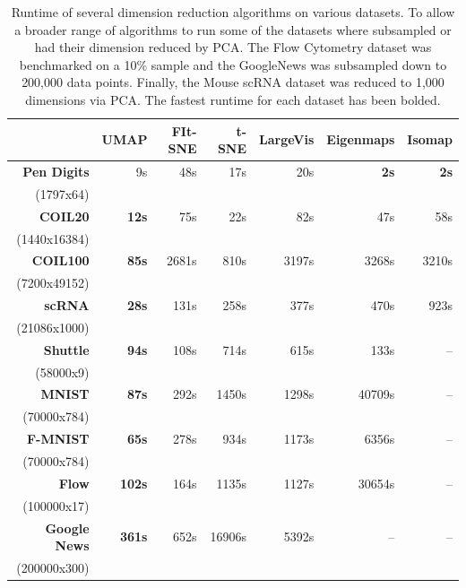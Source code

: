 \documentclass[12pt]{article}
\begin{document}
\begin{table}[!hptb]
    \centering
    \begin{tabular}{rrrrrrr}
    \toprule
      & {\bf UMAP} & {\bf FIt-SNE} & {\bf t-SNE} & {\bf LargeVis} & {\bf Eigenmaps} & {\bf Isomap} \\
    \hline
    {\bf Pen Digits}& 9s & 48s & 17s & 20s & \textbf{2s} & \textbf{2s}\\
    {\small (1797x64)}& & & & & & \\[10pt]
    {\bf COIL20} & \textbf{12s} & 75s & 22s & 82s & 47s & 58s \\
    {\small (1440x16384)}& & & & & & \\[10pt]
    {\bf COIL100} & \textbf{85s} & 2681s & 810s & 3197s & 3268s & 3210s \\
    {\small (7200x49152)}& & & & & & \\[10pt]
    {\bf scRNA} & \textbf{28s} & 131s & 258s & 377s & 470s & 923s \\
    {\small (21086x1000)}& & & & & & \\[10pt]
    {\bf Shuttle} & \textbf{94s} & 108s & 714s & 615s & 133s &  -- \\
    {\small (58000x9)}& & & & & & \\[10pt]
    {\bf MNIST} & \textbf{87s} & 292s & 1450s & 1298s & 40709s & -- \\
    {\small (70000x784)}& & & & & & \\[10pt]
    {\bf F-MNIST} & \textbf{65s} & 278s & 934s & 1173s & 6356s & -- \\
    {\small (70000x784)}& & & & & & \\[10pt]
    {\bf Flow} & \textbf{102s} & 164s & 1135s & 1127s & 30654s & -- \\
    {\small (100000x17)}& & & & & & \\[10pt]
    {\bf Google News} & \textbf{361s} & 652s & 16906s & 5392s & -- & -- \\
    {\small (200000x300)}& & & & & & \\[10pt]
    \bottomrule
    \end{tabular}
    \caption{Runtime of several dimension reduction algorithms on various datasets. To allow a broader range of algorithms to run some of the datasets where subsampled or had their dimension reduced by PCA.  The Flow Cytometry dataset was benchmarked on a 10\% sample and the GoogleNews was subsampled down to 200,000 data points.  Finally, the Mouse scRNA dataset was reduced to 1,000 dimensions via PCA. The fastest runtime for each dataset has been bolded.}
    \label{tab:performance}

\end{table}
\end{document}
